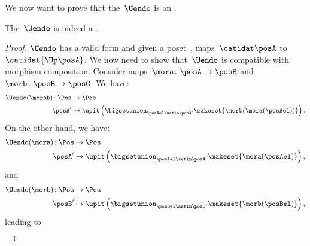 We now want to prove that the~$\Uendo$  is an .

\begin{lemma}
    \label{lem:Uendo-is-functor}
    The~$\Uendo$  is indeed a .
\end{lemma}

\begin{proof}
    $\Uendo$ has a valid form and given a poset~\posA, maps~$\catidat\posA$ to~$\catidat{\Up \posA}$.
    We now need to show that~$\Uendo$ is compatible with morphism composition.
    Consider maps~$\mora\colon \posA \to \posB$ and~$\morb\colon \posB \to \posC$.
    We have:
    \begin{equation}
        \label{eq:ufunctor_1}
        \begin{aligned}
            \Uendo(\morab)\colon \Pos & \to \Pos \\
            \posA'                    & \mapsto \upit \left( \bigsetunion_{\posAel\setin \posA'} \makeset{\morb(\mora(\posAel))}\right).
        \end{aligned}
    \end{equation}
    On the other hand, we have:
    \begin{equation}
        \begin{aligned}
            \Uendo(\mora)\colon \Pos & \to \Pos \\
            \posA'                   & \mapsto \upit \left( \bigsetunion_{\posAel\setin \posA'}\makeset{\mora(\posAel)}\right),
        \end{aligned}
    \end{equation}
    and
    \begin{equation}
        \begin{aligned}
            \Uendo(\morb)\colon \Pos & \to \Pos \\
            \posB'                   & \mapsto \upit \left( \bigsetunion_{\posBel\setin \posB'}\makeset{\morb(\posBel)}\right),
        \end{aligned}
    \end{equation}
    leading to
    \begin{equation}
        \label{eq:ufunctor_2}
        \begin{aligned}

\end{aligned}
\end{equation}
\end{proof}
